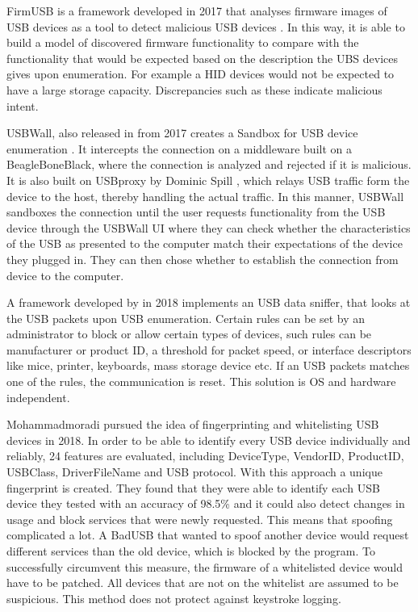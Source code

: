FirmUSB is a framework developed in 2017 that analyses firmware images of USB devices as a tool to detect malicious USB devices \cite{hernandezFirmUSBVettingUSB2017}. In this way, it is able to build a model of discovered firmware functionality to compare with the functionality that would be expected based on the description the UBS devices gives upon enumeration. For example a HID devices would not be expected to have a large storage capacity. Discrepancies such as these indicate malicious intent. 

USBWall, also released in from 2017 creates a Sandbox for USB device enumeration \cite{kangUSBWallNovelSecurity2017}. It intercepts the connection on a middleware built on a BeagleBoneBlack, where the connection is analyzed and rejected if it is malicious. It is also built on USBproxy by Dominic Spill \cite{dominicspillShmooCon2014Open2014}, which relays USB traffic form the device to the host, thereby handling the actual traffic. In this manner, USBWall sandboxes the connection until the user requests functionality from the USB device through the USBWall UI where they can check whether the characteristics of the USB as presented to the computer match their expectations of the device they plugged in. They can then chose whether to establish the connection from device to the computer.  

A framework developed by \cite{erdinOSIndependentHardwareAssisted2018} in 2018 implements an USB data sniffer, that looks at the USB packets upon USB enumeration. Certain rules can be set by an administrator to block or allow certain types of devices, such rules can be manufacturer or product ID, a threshold for packet speed, or interface descriptors like mice, printer, keyboards, mass storage device etc. If an USB packets matches one of the rules, the communication is reset. This solution is OS and hardware independent. 

Mohammadmoradi \cite{mohammadmoradiMakingWhitelistingBasedDefense2018} pursued the idea of fingerprinting and whitelisting USB devices in 2018. In order to be able to identify every USB device individually and reliably, 24 features are evaluated, including DeviceType, VendorID, ProductID, USBClass, DriverFileName and USB protocol. With this approach a unique fingerprint is created. They found that they were able to identify each USB device they tested with an accuracy of 98.5\% and it could also detect changes in usage and block services that were newly requested. This means that spoofing complicated a lot. A BadUSB that wanted to spoof another device would request different services than the old device, which is blocked by the program. To successfully circumvent this measure, the firmware of a whitelisted device would have to be patched. All devices that are not on the whitelist are assumed to be suspicious. This method does not protect against keystroke logging. 

